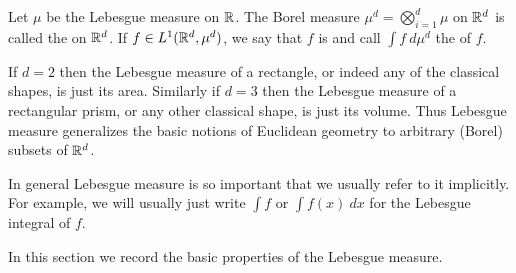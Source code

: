 \begin{definition}
Let $\mu$ be the Lebesgue measure on $\mathbb{R}$.
The Borel measure $\mu^{d} = \bigotimes_{i=1}^{d} \mu$ on $\mathbb{R}^d$ is called the  on $\mathbb{R}^d$.
If $f \in L^1(\mathbb{R}^d, \mu^d)$, we say that $f$ is  and call $\int f~d\mu^d$ the  of $f$.
\end{definition}

If $d = 2$ then the Lebesgue measure of a rectangle, or indeed any of the classical shapes, is just its area.
Similarly if $d = 3$ then the Lebesgue measure of a rectangular prism, or any other classical shape, is just its volume.
Thus Lebesgue measure generalizes the basic notions of Euclidean geometry to arbitrary (Borel) subsets of $\mathbb{R}^d$.

In general Lebesgue measure is so important that we usually refer to it implicitly.
For example, we will usually just write $\int f$ or $\int f(x) ~dx$ for the Lebesgue integral of $f$.

In this section we record the basic properties of the Lebesgue measure.

